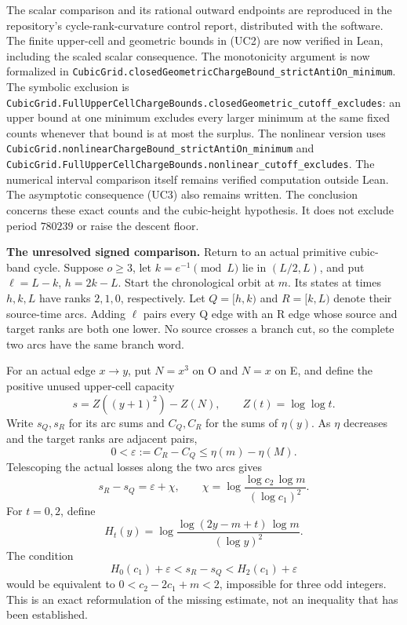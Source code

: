 \documentclass[12pt]{article}
\begin{document}
The scalar comparison and its rational outward endpoints are reproduced
in the repository's cycle-rank-curvature control report, distributed
with the software. The finite upper-cell and geometric bounds in (UC2)
are now verified in Lean, including the scaled scalar consequence. The
monotonicity argument is now formalized in
\texttt{\nolinkurl{CubicGrid.closedGeometricChargeBound_strictAntiOn_minimum}}.
The symbolic exclusion is
\texttt{\nolinkurl{CubicGrid.FullUpperCellChargeBounds.closedGeometric_cutoff_excludes}}:
an upper bound at one minimum excludes every larger minimum at the same
fixed counts whenever that bound is at most the surplus. The nonlinear
version uses
\texttt{\nolinkurl{CubicGrid.nonlinearChargeBound_strictAntiOn_minimum}}
and
\texttt{\nolinkurl{CubicGrid.FullUpperCellChargeBounds.nonlinear_cutoff_excludes}}.
The numerical interval comparison itself remains verified computation
outside Lean. The asymptotic consequence (UC3) also remains written. The
conclusion concerns these exact counts and the cubic-height hypothesis.
It does not exclude period \(780239\) or raise the descent floor.

\textbf{The unresolved signed comparison.} Return to an actual primitive
cubic-band cycle. Suppose \(o\ge3\), let \(k=e^{-1}\pmod L\) lie in
\((L/2,L)\), and put \(\ell=L-k\), \(h=2k-L\). Start the chronological
orbit at \(m\). Its states at times \(h,k,L\) have ranks \(2,1,0\),
respectively. Let \(Q=[h,k)\) and \(R=[k,L)\) denote their source-time
arcs. Adding \(\ell\) pairs every Q edge with an R edge whose source and
target ranks are both one lower. No source crosses a branch cut, so the
complete two arcs have the same branch word.

For an actual edge \(x\to y\), put \(N=x^3\) on O and \(N=x\) on E, and
define the positive unused upper-cell capacity \[
s=Z((y+1)^2)-Z(N),\qquad Z(t)=\log\log t.
\] Write \(s_Q,s_R\) for its arc sums and \(C_Q,C_R\) for the sums of
\(\eta(y)\). As \(\eta\) decreases and the target ranks are adjacent
pairs, \[
0<\varepsilon:=C_R-C_Q\le\eta(m)-\eta(M).
\] Telescoping the actual losses along the two arcs gives \[
s_R-s_Q=\varepsilon+\chi,\qquad
\chi=\log\frac{\log c_2\,\log m}{(\log c_1)^2}.
\tag{UC5}
\] For \(t=0,2\), define \[
H_t(y)=\log\frac{\log(2y-m+t)\,\log m}{(\log y)^2}.
\] The condition \[
H_0(c_1)+\varepsilon<s_R-s_Q<H_2(c_1)+\varepsilon
\tag{UC6}
\] would be equivalent to \(0<c_2-2c_1+m<2\), impossible for three odd
integers. This is an exact reformulation of the missing estimate, not an
inequality that has been established.
\end{document}
